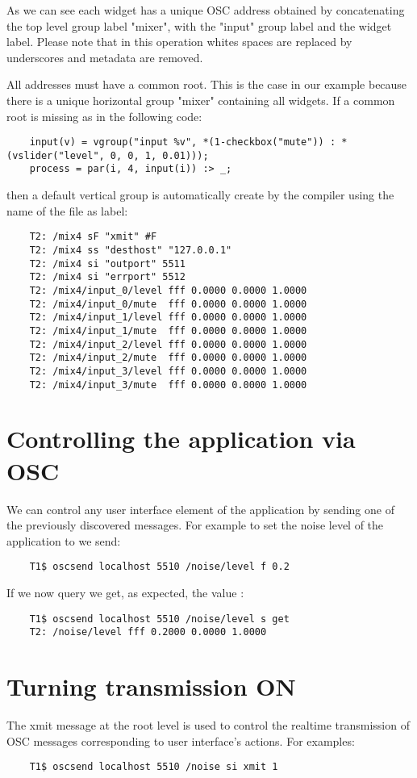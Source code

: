 As we can see each widget has a unique OSC address obtained by concatenating the top level group label "mixer", with the "input" group label and the widget label. Please note that in this operation whites spaces are replaced by underscores and metadata are removed. 

All addresses must have a common root. This is the case in our example because there is a unique horizontal group "mixer" containing all widgets. If a common root is missing as in the following code:
\begin{lstlisting}
	input(v) = vgroup("input %v", *(1-checkbox("mute")) : *(vslider("level", 0, 0, 1, 0.01)));
	process = par(i, 4, input(i)) :> _;
\end{lstlisting}
then a default vertical group is automatically create by the \faust compiler using the name of the file  as label:
\begin{lstlisting}
	T2: /mix4 sF "xmit" #F
	T2: /mix4 ss "desthost" "127.0.0.1"
	T2: /mix4 si "outport" 5511
	T2: /mix4 si "errport" 5512
	T2: /mix4/input_0/level fff 0.0000 0.0000 1.0000
	T2: /mix4/input_0/mute  fff 0.0000 0.0000 1.0000
	T2: /mix4/input_1/level fff 0.0000 0.0000 1.0000
	T2: /mix4/input_1/mute  fff 0.0000 0.0000 1.0000
	T2: /mix4/input_2/level fff 0.0000 0.0000 1.0000
	T2: /mix4/input_2/mute  fff 0.0000 0.0000 1.0000
	T2: /mix4/input_3/level fff 0.0000 0.0000 1.0000
	T2: /mix4/input_3/mute  fff 0.0000 0.0000 1.0000
\end{lstlisting}

 
\section{Controlling the application via OSC}

We can control any user interface element of the application by sending one of the previously discovered messages. For example to set the noise level of the application to  we send:
\begin{lstlisting}
	T1$ oscsend localhost 5510 /noise/level f 0.2
\end{lstlisting}
	
If we now query  we get, as expected, the value :
\begin{lstlisting}
	T1$ oscsend localhost 5510 /noise/level s get
	T2: /noise/level fff 0.2000 0.0000 1.0000
\end{lstlisting}


\section{Turning transmission ON}
The xmit message at the root level is used to control the realtime transmission of OSC messages corresponding to user interface's actions. For examples:
\begin{lstlisting}
	T1$ oscsend localhost 5510 /noise si xmit 1
\end{lstlisting}

